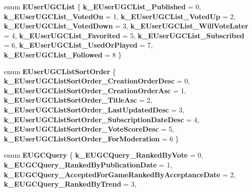 \begin{DoxyCompactItemize}
\item 
\mbox{\label{namespace_valve_1_1_steamworks_af54f5a73c7431c1ed4d4ad44dd4c57bc}} 
enum {\bfseries E\+User\+U\+G\+C\+List} \{ \newline
{\bfseries k\+\_\+\+E\+User\+U\+G\+C\+List\+\_\+\+Published} = 0, 
{\bfseries k\+\_\+\+E\+User\+U\+G\+C\+List\+\_\+\+Voted\+On} = 1, 
{\bfseries k\+\_\+\+E\+User\+U\+G\+C\+List\+\_\+\+Voted\+Up} = 2, 
{\bfseries k\+\_\+\+E\+User\+U\+G\+C\+List\+\_\+\+Voted\+Down} = 3, 
\newline
{\bfseries k\+\_\+\+E\+User\+U\+G\+C\+List\+\_\+\+Will\+Vote\+Later} = 4, 
{\bfseries k\+\_\+\+E\+User\+U\+G\+C\+List\+\_\+\+Favorited} = 5, 
{\bfseries k\+\_\+\+E\+User\+U\+G\+C\+List\+\_\+\+Subscribed} = 6, 
{\bfseries k\+\_\+\+E\+User\+U\+G\+C\+List\+\_\+\+Used\+Or\+Played} = 7, 
\newline
{\bfseries k\+\_\+\+E\+User\+U\+G\+C\+List\+\_\+\+Followed} = 8
 \}
\item 
\mbox{\label{namespace_valve_1_1_steamworks_ad129255cf00d8d70b51fa282429e26b6}} 
enum {\bfseries E\+User\+U\+G\+C\+List\+Sort\+Order} \{ \newline
{\bfseries k\+\_\+\+E\+User\+U\+G\+C\+List\+Sort\+Order\+\_\+\+Creation\+Order\+Desc} = 0, 
{\bfseries k\+\_\+\+E\+User\+U\+G\+C\+List\+Sort\+Order\+\_\+\+Creation\+Order\+Asc} = 1, 
{\bfseries k\+\_\+\+E\+User\+U\+G\+C\+List\+Sort\+Order\+\_\+\+Title\+Asc} = 2, 
{\bfseries k\+\_\+\+E\+User\+U\+G\+C\+List\+Sort\+Order\+\_\+\+Last\+Updated\+Desc} = 3, 
\newline
{\bfseries k\+\_\+\+E\+User\+U\+G\+C\+List\+Sort\+Order\+\_\+\+Subscription\+Date\+Desc} = 4, 
{\bfseries k\+\_\+\+E\+User\+U\+G\+C\+List\+Sort\+Order\+\_\+\+Vote\+Score\+Desc} = 5, 
{\bfseries k\+\_\+\+E\+User\+U\+G\+C\+List\+Sort\+Order\+\_\+\+For\+Moderation} = 6
 \}
\item 
\mbox{\label{namespace_valve_1_1_steamworks_aac3fab43488ce6e87b3e5504f8874213}} 
enum {\bfseries E\+U\+G\+C\+Query} \{ \newline
{\bfseries k\+\_\+\+E\+U\+G\+C\+Query\+\_\+\+Ranked\+By\+Vote} = 0, 
{\bfseries k\+\_\+\+E\+U\+G\+C\+Query\+\_\+\+Ranked\+By\+Publication\+Date} = 1, 
{\bfseries k\+\_\+\+E\+U\+G\+C\+Query\+\_\+\+Accepted\+For\+Game\+Ranked\+By\+Acceptance\+Date} = 2, 
{\bfseries k\+\_\+\+E\+U\+G\+C\+Query\+\_\+\+Ranked\+By\+Trend} = 3, 

\end{DoxyCompactItemize}
